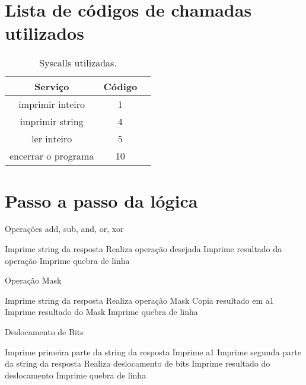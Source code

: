 \documentclass[a4paper, 12 pt]{article}
\begin{document}
    \section{Lista de códigos de chamadas utilizados}

    \begin{table}[!htb]
        \centering
        \begin{tabular}{|c|c|c|}
            \hline
            Serviço             & Código \\ \hline \hline
            imprimir inteiro    & 1      \\ \hline
            imprimir string     & 4      \\ \hline
            ler inteiro         & 5      \\ \hline
            encerrar o programa & 10     \\ \hline
        \end{tabular}
        \caption{Syscalls utilizadas.}
    \end{table}

    \newpage
    \section{Passo a passo da lógica}

    \begin{algorithm}
        \caption{Operações add, sub, and, or, xor}
        \SetAlgoLined
        \DontPrintSemicolon

        Imprime string da resposta\;
        Realiza operação desejada\;
        Imprime resultado da operação\;
        Imprime quebra de linha\;


    \end{algorithm}

    \begin{algorithm}
        \caption{Operação Mask}
        \SetAlgoLined
        \DontPrintSemicolon

        Imprime string da resposta\;
        Realiza operação Mask\;
        Copia resultado em a1\;
        Imprime resultado do Mask\;
        Imprime quebra de linha\;


    \end{algorithm}

    \begin{algorithm}
        \caption{Deslocamento de Bits}
        \SetAlgoLined
        \DontPrintSemicolon

        Imprime primeira parte da string da resposta\;
        Imprime a1\;
        Imprime segunda parte da string da resposta\;
        Realiza deslocamento de bits\;
        Imprime resultado do deslocamento\;
        Imprime quebra de linha\;

    \end{algorithm}
\end{document}
